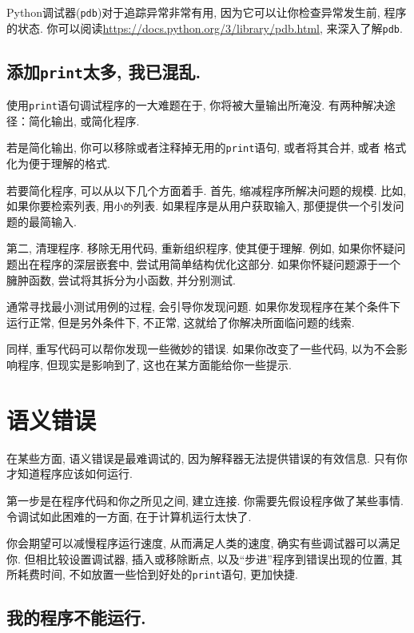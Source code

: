 \documentclass[10pt]{book}
\begin{document}
Python调试器({\tt pdb})对于追踪异常非常有用, 
因为它可以让你检查异常发生前, 程序的状态. 
你可以阅读\url{https://docs.python.org/3/library/pdb.html}, 来深入了解{\tt pdb}.


\subsection{添加{\tt print}太多, 我已混乱.}

使用{\tt print}语句调试程序的一大难题在于, 你将被大量输出所淹没. 
有两种解决途径：简化输出, 或简化程序. 

若是简化输出, 你可以移除或者注释掉无用的{\tt print}语句, 或者将其合并, 或者
格式化为便于理解的格式. 

若要简化程序, 可以从以下几个方面着手. 
首先, 缩减程序所解决问题的规模. 
比如, 如果你要检索列表, 用{\tt 小的}列表. 
如果程序是从用户获取输入, 那便提供一个引发问题的最简输入. 

第二, 清理程序. 移除无用代码, 重新组织程序, 使其便于理解. 
例如, 如果你怀疑问题出在程序的深层嵌套中, 
尝试用简单结构优化这部分. 
如果你怀疑问题源于一个臃肿函数, 尝试将其拆分为小函数, 并分别测试. 

通常寻找最小测试用例的过程, 会引导你发现问题. 
如果你发现程序在某个条件下运行正常, 但是另外条件下, 不正常, 
这就给了你解决所面临问题的线索. 

同样, 重写代码可以帮你发现一些微妙的错误. 
如果你改变了一些代码, 以为不会影响程序, 但现实是影响到了, 
这也在某方面能给你一些提示. 


\section{语义错误}

在某些方面, 语义错误是最难调试的, 
因为解释器无法提供错误的有效信息. 
只有你才知道程序应该如何运行. 

第一步是在程序代码和你之所见之间, 建立连接. 
你需要先假设程序做了某些事情. 
令调试如此困难的一方面, 在于计算机运行太快了. 

你会期望可以减慢程序运行速度, 从而满足人类的速度, 
确实有些调试器可以满足你. 
但相比较设置调试器, 插入或移除断点, 以及``步进''程序到错误出现的位置, 其所耗费时间, 
不如放置一些恰到好处的{\tt print}语句, 更加快捷. 

\subsection{我的程序不能运行.}
\end{document}
